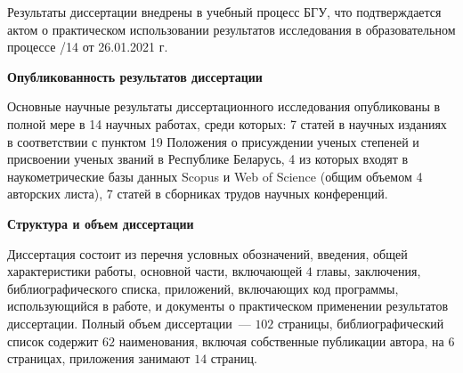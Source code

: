 \documentclass[_00_dissertation.tex]{subfiles}
\begin{document}
Результаты диссертации внедрены в учебный процесс БГУ, что подтверждается актом о практическом использовании результатов исследования в образовательном процессе /14 от 26.01.2021 г.

\begin{center}
\textbf{Опубликованность результатов диссертации}
\end{center}

Основные научные результаты диссертационного исследования опубликованы в полной мере в 14 научных работах, среди которых: 7 статей в научных изданиях в соответствии с пунктом 19 Положения о присуждении ученых степеней и присвоении ученых званий в Республике Беларусь, 4 из которых входят в наукометрические базы данных Scopus и Web of Science (общим объемом 4 авторских листа), 7 статей в сборниках трудов научных конференций.

\begin{center}
\textbf{Структура и объем диссертации}
\end{center}

Диссертация состоит из перечня условных обозначений, введения, общей характеристики работы, основной части, включающей $4$ главы, заключения, библиографического списка, приложений, включающих код программы, использующийся в работе, и документы о практическом применении результатов диссертации.
Полный объем диссертации~--- $102$ страницы, библиографический список содержит $62$ наименования, включая собственные публикации автора, на $6$ страницах, приложения занимают $14$ страниц.

\onlyinsubfile{
    
}
\end{document}
